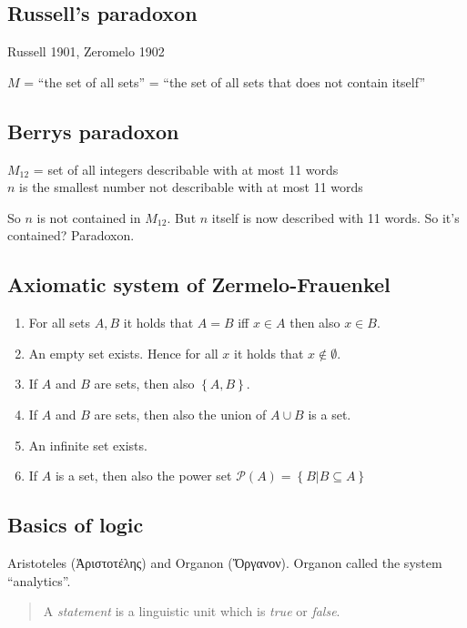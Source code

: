 \documentclass[a4paper,landscape,twocolumn]{article}
\newcommand\set[1]{\left\{#1\right\}}
\newcommand{\textgreek}[1]{\begingroup\fontencoding{LGR}\selectfont#1\endgroup}
\begin{document}
\subsection{Russell's paradoxon}

Russell 1901, Zeromelo 1902

$M$ = \enquote{the set of all sets} = \enquote{the set of all sets that does not contain itself}

\subsection{Berrys paradoxon}

$M_{12}$ = set of all integers describable with at most 11 words \\
$n$ is the smallest number not describable with at most 11 words

So $n$ is not contained in $M_{12}$. But $n$ itself is now described with 11 words.
So it's contained? Paradoxon.

\subsection{Axiomatic system of Zermelo-Frauenkel}

\begin{enumerate}
  \item For all sets $A, B$ it holds that $A = B$ iff $x \in A$ then also $x \in B$.
  \item An empty set exists. Hence for all $x$ it holds that $x \notin \emptyset$.
  \item If $A$ and $B$ are sets, then also $\set{A, B}$.
  \item If $A$ and $B$ are sets, then also the union of  $A \cup B$ is a set.
  \item An infinite set exists.
  \item If $A$ is a set, then also the power set $\mathcal{P}(A) = \set{B | B \subseteq A}$
\end{enumerate}

\subsection{Basics of logic}

Aristoteles (\textgreek{Ἀριστοτέλης}) and Organon (\textgreek{Ὄργανον}).
Organon called the system \enquote{analytics}.

\begin{quote}
  A \emph{statement} is a linguistic unit which is \emph{true} or \emph{false}.
\end{quote}
\end{document}
